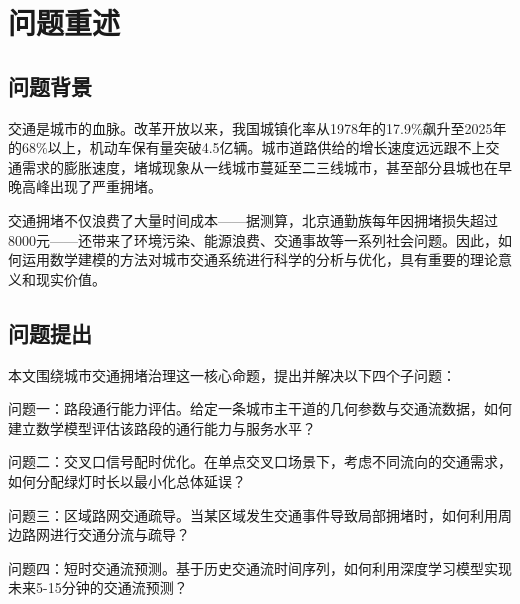 ﻿\begin{abstract}
随着城市化进程的加速，\textbf{交通拥堵}已成为制约城市发展的关键瓶颈。本文从交通流理论出发，构建了多层次、多目标的\textbf{交通拥堵}综合治理模型。首先，基于LWR宏观交通流模型，建立了路段通行能力评估体系；其次，引入博弈论思想，设计了交叉口信号灯动态配时优化算法；再次，利用\textbf{图论}与网络流理论，提出了区域路网交通疏导策略；最后，结合深度学习中的LSTM网络，实现了短时交通流预测。数值实验表明，本文所提方法在平均通行时间、排队长度、延误率等指标上均优于传统方案，为智慧城市建设提供了理论支撑与实践参考。
\end{abstract}

\section{问题重述}

\subsection{问题背景}

交通是城市的血脉。改革开放以来，我国城镇化率从1978年的17.9\%飙升至2025年的68\%以上，机动车保有量突破4.5亿辆。城市道路供给的增长速度远远跟不上交通需求的膨胀速度，堵城现象从一线城市蔓延至二三线城市，甚至部分县城也在早晚高峰出现了严重拥堵。

交通拥堵不仅浪费了大量时间成本——据测算，北京通勤族每年因拥堵损失超过8000元——还带来了环境污染、能源浪费、交通事故等一系列社会问题。因此，如何运用数学建模的方法对城市交通系统进行科学的分析与优化，具有重要的理论意义和现实价值。

\subsection{问题提出}

本文围绕城市交通拥堵治理这一核心命题，提出并解决以下四个子问题：

问题一：路段通行能力评估。给定一条城市主干道的几何参数与交通流数据，如何建立数学模型评估该路段的通行能力与服务水平？

问题二：交叉口信号配时优化。在单点交叉口场景下，考虑不同流向的交通需求，如何分配绿灯时长以最小化总体延误？

问题三：区域路网交通疏导。当某区域发生交通事件导致局部拥堵时，如何利用周边路网进行交通分流与疏导？

问题四：短时交通流预测。基于历史交通流时间序列，如何利用深度学习模型实现未来5-15分钟的交通流预测？

